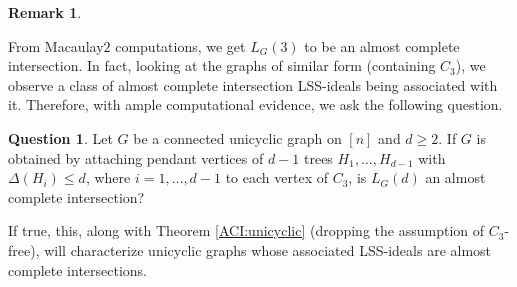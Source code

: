 \documentclass[11pt,a4paper,reqno]{amsart}
\theoremstyle{definition}
\newtheorem{remark}[thm]{Remark}
\numberwithin{equation}{section}
\newtheorem{question}{Question}[section]
\DeclareMathOperator{\het}{ht}
\DeclareMathOperator{\Min}{Min}
\begin{document}
\begin{remark}
\begin{figure}[ht]
\end{figure}
From Macaulay$2$ computations, we get $L_G(3)$ to be an almost complete intersection. In fact, looking at the graphs of similar form (containing $C_3$), we observe a class of almost complete intersection LSS-ideals being associated with it. Therefore, with ample computational evidence, we ask the following question. 
\end{remark}


\begin{question} \label{triACI}
    Let $G$ be a connected unicyclic graph on $[n]$ and $d\geq 2$. If $G$ is obtained by attaching pendant vertices of $d-1$ trees $H_1,\ldots,H_{d-1}$ with $\Delta(H_i)\leq d$, where $i=1,\ldots,d-1$ to each vertex of $C_3$, is $L_G(d)$ an almost complete intersection?
\end{question}


If true, this, along with Theorem \ref{ACI:unicyclic} (dropping the assumption of $C_3$-free), will characterize unicyclic graphs whose associated LSS-ideals are almost complete intersections.
\end{document}
